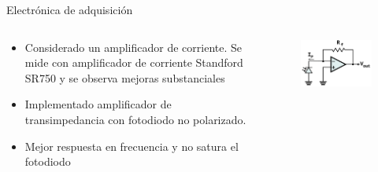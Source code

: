 \begin{frame}{Electrónica de adquisición}
\begin{columns}[c]
    \begin{column}{0.5\textwidth}
        \begin{itemize}
        \item Considerado un amplificador de corriente. Se mide con amplificador de corriente Standford SR750 y se observa mejoras substanciales
        \item Implementado amplificador de transimpedancia con fotodiodo no polarizado. 
        \item Mejor respuesta en frecuencia y no satura el fotodiodo
        \end{itemize}
    \end{column}
    \begin{column}{0.4\textwidth}
        \begin{figure}[H]
        \centering
        \includegraphics[width=1.1\textwidth]{fig/circuito/amp/TIA.png}
        \label{fig:circuito/amp/TIA}
        \end{figure}
    \end{column}
\end{columns}



\end{frame}

